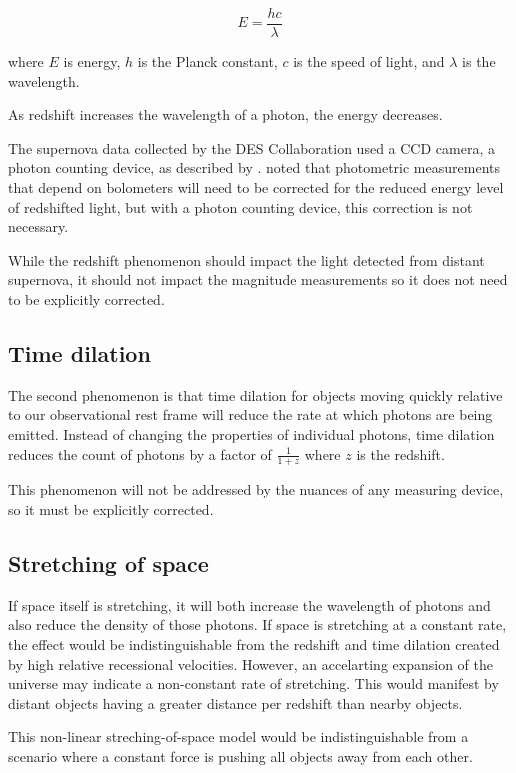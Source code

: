 \documentclass{article}
\begin{document}
\begin{equation}
  E = \frac{hc}{\lambda}
\end{equation}

where $E$ is energy, $h$ is the Planck constant, $c$ is the speed of light, and
$\lambda$ is the wavelength.

As redshift increases the wavelength of a photon, the energy decreases.

The supernova data collected by the DES Collaboration used a CCD camera, a
photon counting device, as described by \citet{flaughter2015}.  \citet{kim1996}
noted that photometric measurements that depend on bolometers will need to be
corrected for the reduced energy level of redshifted light, but with a photon
counting device, this correction is not necessary.

While the redshift phenomenon should impact the light detected from distant
supernova, it should not impact the magnitude measurements so it does not need
to be explicitly corrected.

\subsection{Time dilation}

The second phenomenon is that time dilation for objects moving quickly relative
to our observational rest frame will reduce the rate at which photons are being
emitted. Instead of changing the properties of individual photons, time
dilation reduces the count of photons by a factor of $\frac{1}{1+z}$ where $z$
is the redshift.

This phenomenon will not be addressed by the nuances of any measuring device,
so it must be explicitly corrected.

\subsection{Stretching of space}

If space itself is stretching, it will both increase the wavelength of photons
and also reduce the density of those photons. If space is stretching at a
constant rate, the effect would be indistinguishable from the redshift and time
dilation created by high relative recessional velocities. However, an
accelarting expansion of the universe may indicate a non-constant rate of
stretching. This would manifest by distant objects having a greater distance
per redshift than nearby objects.

This non-linear streching-of-space model would be indistinguishable from a
scenario where a constant force is pushing all objects away from each other.
\end{document}
